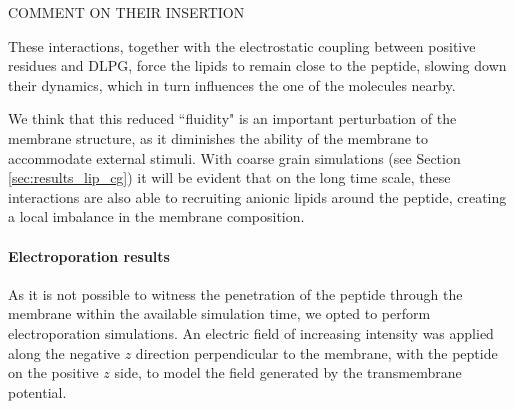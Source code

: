 COMMENT ON THEIR INSERTION

%
These interactions, together with the electrostatic coupling between positive residues and DLPG, force the lipids to remain close to the peptide, slowing down their dynamics, which in turn influences the one of the molecules nearby.

We think that this reduced ``fluidity" is an important perturbation of the membrane structure, as it diminishes the ability of the membrane to accommodate external stimuli. With coarse grain simulations (see Section \ref{sec:results_lip_cg}) it will be evident that on the long time scale, these interactions are also able to recruiting anionic lipids around the peptide, creating a local imbalance in the membrane composition.


\paragraph{Electroporation results}
As it is not possible to witness the penetration of the peptide through the membrane within the available simulation time, we opted to perform electroporation simulations.
%
An electric field of increasing intensity was applied along the negative $z$ direction perpendicular to the membrane, with the peptide on the positive $z$ side, to model the field generated by the transmembrane potential.

